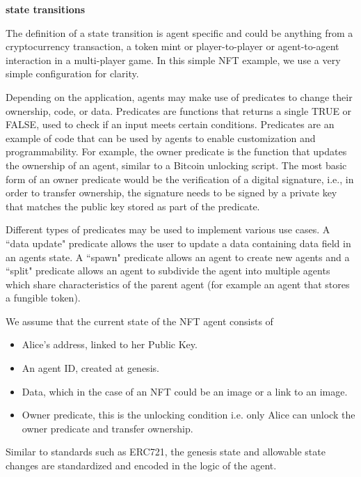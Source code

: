 \documentclass{article}
\begin{document}
\textbf{state transitions}
\vspace{2mm}


The definition of a state transition is agent specific and could be anything from a cryptocurrency transaction, a token mint or player-to-player or agent-to-agent interaction in a multi-player game. In this simple NFT example, we use a very simple configuration for clarity.
\vspace{2mm}

Depending on the application, agents may make use of predicates to change their ownership, code, or data. Predicates are functions that returns a single TRUE or FALSE, used to check if an input meets certain conditions. Predicates are an example of code that can be used by agents to enable customization and programmability. For example, the owner predicate is the function that updates the ownership of an agent, similar to a Bitcoin unlocking script. The most basic form of an owner predicate would be the verification of a digital signature, i.e., in order to transfer ownership, the signature needs to be signed by a private key that matches the public key stored as part of the predicate.
\vspace{2mm}

Different types of predicates may be used to implement various use cases.  A ``data update" predicate allows the user to update a data containing data field in an agents state.  A ``spawn" predicate allows an agent to create new agents and a ``split" predicate allows an agent to subdivide the agent into multiple agents which share characteristics of the parent agent (for example an agent that stores a fungible token).
\vspace{2mm}

We assume that the current state of the NFT agent consists of 

\begin{itemize}
\setlength{\leftmargin}{1em}
 \item  Alice's address, linked to her Public Key.
 \item  An agent ID, created at genesis.
 \item  Data, which in the case of an NFT could be an image or a link to an image.
 \item  Owner  predicate, this is the unlocking condition i.e. only Alice can unlock the owner predicate and transfer ownership.
\end{itemize}

 Similar to standards such as ERC721, the genesis state and allowable state changes are standardized and encoded in the logic of the agent. 
\end{document}
